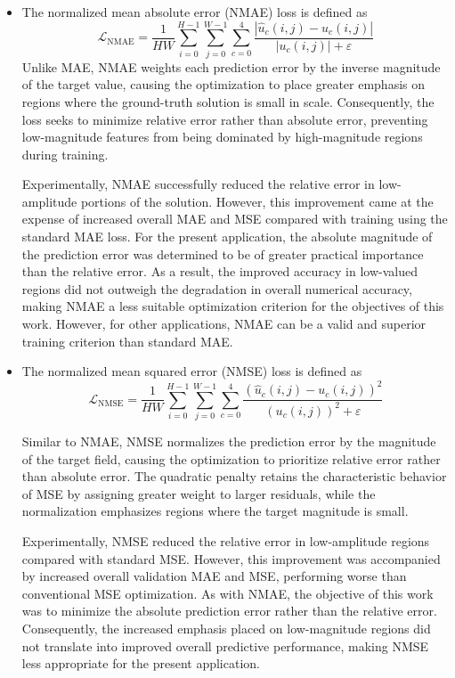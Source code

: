 \documentclass[preprint,review,12pt]{elsarticle}
\begin{document}
\begin{itemize}
\item The normalized mean absolute error (NMAE) loss is defined as
\begin{equation*}
    \mathcal{L}_{\text{NMAE}} = \frac{1}{HW} \sum_{i=0}^{H-1} \sum_{j=0}^{W-1} \sum_{c=0}^{4} \frac{\displaystyle \left| \hat{u}_{c}(i,j) - u_{c}(i,j) \right|}{\left| u_{c}(i,j) \right| + \varepsilon}
\end{equation*}
Unlike MAE, NMAE weights each prediction error by the inverse magnitude of the target value, causing the optimization to place greater emphasis on regions where the ground-truth solution is small in scale. Consequently, the loss seeks to minimize relative error rather than absolute error, preventing low-magnitude features from being dominated by high-magnitude regions during training.

Experimentally, NMAE successfully reduced the relative error in low-amplitude portions of the solution. However, this improvement came at the expense of increased overall MAE and MSE compared with training using the standard MAE loss. For the present application, the absolute magnitude of the prediction error was determined to be of greater practical importance than the relative error. As a result, the improved accuracy in low-valued regions did not outweigh the degradation in overall numerical accuracy, making NMAE a less suitable optimization criterion for the objectives of this work. However, for other applications, NMAE can be a valid and superior training criterion than standard MAE.

\item The normalized mean squared error (NMSE) loss is defined as
\begin{equation*}
    \mathcal{L}_{\text{NMSE}} = \frac{1}{HW} \sum_{i=0}^{H-1} \sum_{j=0}^{W-1} \sum_{c=0}^{4} \frac{\displaystyle \left(\hat{u}_{c}(i,j) - u_{c}(i,j) \right)^2}{\left( u_{c}(i,j) \right)^2 + \varepsilon}
\end{equation*}

Similar to NMAE, NMSE normalizes the prediction error by the magnitude of the target field, causing the optimization to prioritize relative error rather than absolute error. The quadratic penalty retains the characteristic behavior of MSE by assigning greater weight to larger residuals, while the normalization emphasizes regions where the target magnitude is small.

Experimentally, NMSE reduced the relative error in low-amplitude regions compared with standard MSE. However, this improvement was accompanied by increased overall validation MAE and MSE, performing worse than conventional MSE optimization. As with NMAE, the objective of this work was to minimize the absolute prediction error rather than the relative error. Consequently, the increased emphasis placed on low-magnitude regions did not translate into improved overall predictive performance, making NMSE less appropriate for the present application.
\end{itemize}
\end{document}
